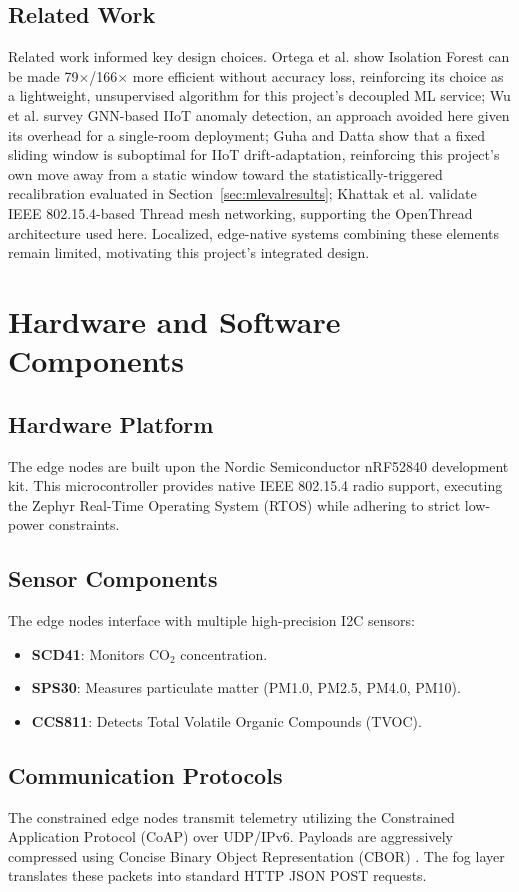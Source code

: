 \documentclass[conference]{IEEEtran}
\begin{document}
\subsection{Related Work}
Related work informed key design choices. Ortega et al. \cite{b16} show Isolation Forest can be made 79$\times$/166$\times$ more efficient without accuracy loss, reinforcing its choice as a lightweight, unsupervised algorithm for this project's decoupled ML service; Wu et al. \cite{b17} survey GNN-based IIoT anomaly detection, an approach avoided here given its overhead for a single-room deployment; Guha and Datta \cite{b18} show that a fixed sliding window is suboptimal for IIoT drift-adaptation, reinforcing this project's own move away from a static window toward the statistically-triggered recalibration evaluated in Section~\ref{sec:mlevalresults}; Khattak et al. \cite{b19} validate IEEE 802.15.4-based Thread mesh networking, supporting the OpenThread architecture used here. Localized, edge-native systems combining these elements remain limited, motivating this project's integrated design.

\section{Hardware and Software Components}
\subsection{Hardware Platform}
The edge nodes are built upon the Nordic Semiconductor nRF52840 development kit. This microcontroller provides native IEEE 802.15.4 radio support, executing the Zephyr Real-Time Operating System (RTOS) \cite{b6} while adhering to strict low-power constraints.

\subsection{Sensor Components}
The edge nodes interface with multiple high-precision I2C sensors:
\begin{itemize}
\setlength{\itemsep}{0pt}
\item \textbf{SCD41}: Monitors CO$_2$ concentration.
\item \textbf{SPS30}: Measures particulate matter (PM1.0, PM2.5, PM4.0, PM10).
\item \textbf{CCS811}: Detects Total Volatile Organic Compounds (TVOC).
\end{itemize}

\subsection{Communication Protocols}
The constrained edge nodes transmit telemetry utilizing the Constrained Application Protocol (CoAP) \cite{b8} over UDP/IPv6. Payloads are aggressively compressed using Concise Binary Object Representation (CBOR) \cite{b9}. The fog layer translates these packets into standard HTTP JSON POST requests.
\end{document}
